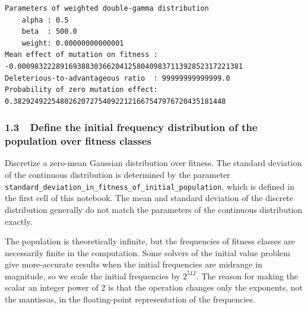 \documentclass[11pt]{article}
\begin{document}
    \begin{Verbatim}[commandchars=\\\{\}]
Parameters of weighted double-gamma distribution
    alpha : 0.5
    beta  : 500.0
    weight: 0.00000000000001
Mean effect of mutation on fitness : -0.00098322289169388303662041258040983711392852317221381
Deleterious-to-advantageous ratio  : 99999999999999.0
Probability of zero mutation effect: 0.38292492254802620727540922121667547976720435181448

    \end{Verbatim}

    \subsubsection{1.3~~Define the initial frequency distribution of the
population over fitness
classes}\label{define-the-initial-frequency-distribution-of-the-population-over-fitness-classes}

Discretize a zero-mean Gaussian distribution over fitness. The standard
deviation of the continuous distribution is determined by the parameter
\texttt{standard\_deviation\_in\_fitness\_of\_initial\_population},
which is defined in the first cell of this notebook. The mean and
standard deviation of the discrete distribution generally do not match
the parameters of the continuous distribution exactly.

The population is theoretically infinite, but the frequencies of fitness
classes are necessarily finite in the computation. Some solvers of the
initial value problem give more-accurate results when the initial
frequencies are midrange in magnitude, so we scale the initial
frequencies by \(2^{512}.\) The reason for making the scalar an integer
power of 2 is that the operation changes only the exponents, not the
mantissas, in the floating-point representation of the frequencies.
\end{document}
